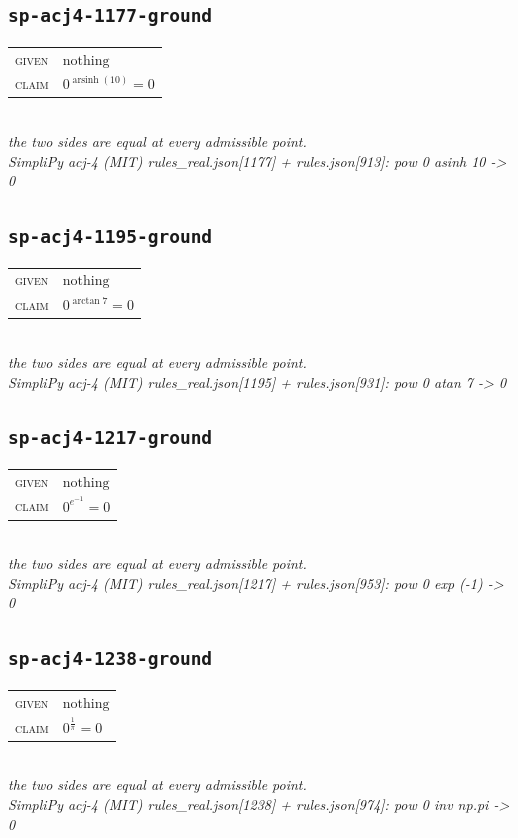 \documentclass[11pt]{article}
\begin{document}
\subsection*{\texttt{sp-acj4-1177-ground}}
\begin{tabular}{@{}l@{\quad}l@{}}
\textsc{given} & $\text{nothing}$ \\[4pt]
\textsc{claim} & $\displaystyle 0^{\operatorname{arsinh}\left(10\right)} = 0$ \\
\end{tabular}\\[2pt]
{\small\emph{the two sides are equal at every admissible point.}}\\
\emph{SimpliPy acj-4 (MIT) rules\_real.json[1177] + rules.json[913]: pow 0 asinh 10  ->  0}\\

\subsection*{\texttt{sp-acj4-1195-ground}}
\begin{tabular}{@{}l@{\quad}l@{}}
\textsc{given} & $\text{nothing}$ \\[4pt]
\textsc{claim} & $\displaystyle 0^{\arctan 7} = 0$ \\
\end{tabular}\\[2pt]
{\small\emph{the two sides are equal at every admissible point.}}\\
\emph{SimpliPy acj-4 (MIT) rules\_real.json[1195] + rules.json[931]: pow 0 atan 7  ->  0}\\

\subsection*{\texttt{sp-acj4-1217-ground}}
\begin{tabular}{@{}l@{\quad}l@{}}
\textsc{given} & $\text{nothing}$ \\[4pt]
\textsc{claim} & $\displaystyle 0^{e^{-1}} = 0$ \\
\end{tabular}\\[2pt]
{\small\emph{the two sides are equal at every admissible point.}}\\
\emph{SimpliPy acj-4 (MIT) rules\_real.json[1217] + rules.json[953]: pow 0 exp (-1)  ->  0}\\

\subsection*{\texttt{sp-acj4-1238-ground}}
\begin{tabular}{@{}l@{\quad}l@{}}
\textsc{given} & $\text{nothing}$ \\[4pt]
\textsc{claim} & $\displaystyle 0^{\frac{1}{\pi}} = 0$ \\
\end{tabular}\\[2pt]
{\small\emph{the two sides are equal at every admissible point.}}\\
\emph{SimpliPy acj-4 (MIT) rules\_real.json[1238] + rules.json[974]: pow 0 inv np.pi  ->  0}\\
\end{document}

